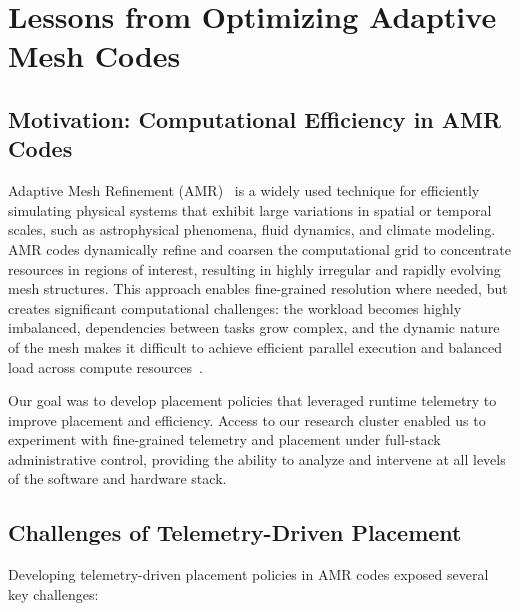 \chapter{Lessons from Optimizing Adaptive Mesh Codes}
\label{chap:amr}
\minitoc

\section{Motivation: Computational Efficiency in AMR Codes}

Adaptive Mesh Refinement (AMR)~\cite{Dubey2014:Survey,Grete2023:Parthenon,Zhang2021:AMReX} is a
widely used technique for efficiently simulating physical systems that exhibit large variations in
spatial or temporal scales, such as astrophysical phenomena, fluid dynamics, and climate modeling.
AMR codes dynamically refine and coarsen the computational grid to concentrate resources in regions
of interest, resulting in highly irregular and rapidly evolving mesh structures.
This approach enables fine-grained resolution where needed, but creates significant computational
challenges: the workload becomes highly imbalanced, dependencies between tasks grow complex, and
the dynamic nature of the mesh makes it difficult to achieve efficient parallel execution and
balanced load across compute
resources~\cite{Klenk2017:OverviewMPICharacteristics,Dubey2014:Survey,Burst2008:ALPS}.

Our goal was to develop placement policies that leveraged runtime telemetry to improve placement
and efficiency.
Access to our research cluster enabled us to experiment with fine-grained telemetry and placement
under full-stack administrative control, providing the ability to analyze and intervene at all
levels of the software and hardware stack.

\section{Challenges of Telemetry-Driven Placement}

Developing telemetry-driven placement policies in AMR codes exposed several
key challenges:

